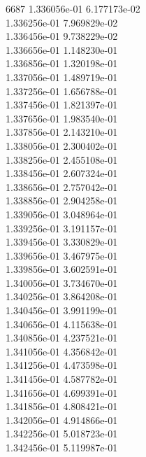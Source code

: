 6687	1.336056e-01	6.177173e-02	\\ 	1.336256e-01	7.969829e-02	\\ 	1.336456e-01	9.738229e-02	\\ 	1.336656e-01	1.148230e-01	\\ 	1.336856e-01	1.320198e-01	\\ 	1.337056e-01	1.489719e-01	\\ 	1.337256e-01	1.656788e-01	\\ 	1.337456e-01	1.821397e-01	\\ 	1.337656e-01	1.983540e-01	\\ 	1.337856e-01	2.143210e-01	\\ 	1.338056e-01	2.300402e-01	\\ 	1.338256e-01	2.455108e-01	\\ 	1.338456e-01	2.607324e-01	\\ 	1.338656e-01	2.757042e-01	\\ 	1.338856e-01	2.904258e-01	\\ 	1.339056e-01	3.048964e-01	\\ 	1.339256e-01	3.191157e-01	\\ 	1.339456e-01	3.330829e-01	\\ 	1.339656e-01	3.467975e-01	\\ 	1.339856e-01	3.602591e-01	\\ 	1.340056e-01	3.734670e-01	\\ 	1.340256e-01	3.864208e-01	\\ 	1.340456e-01	3.991199e-01	\\ 	1.340656e-01	4.115638e-01	\\ 	1.340856e-01	4.237521e-01	\\ 	1.341056e-01	4.356842e-01	\\ 	1.341256e-01	4.473598e-01	\\ 	1.341456e-01	4.587782e-01	\\ 	1.341656e-01	4.699391e-01	\\ 	1.341856e-01	4.808421e-01	\\ 	1.342056e-01	4.914866e-01	\\ 	1.342256e-01	5.018723e-01	\\ 	1.342456e-01	5.119987e-01	\\ \hline
